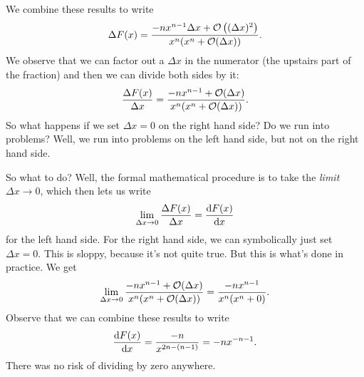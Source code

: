 We combine these results to write
\begin{equation}
\Delta F(x)=\frac{-nx^{n-1}\Delta x+\mathcal{O}\left((\Delta x)^{2}\right)}{x^{n}(x^{n}+\mathcal{O}(\Delta x))}.
\end{equation}
We observe that we can factor out a $\Delta x$ in the numerator
(the upstairs part of the fraction) and then we can divide both
sides by it:
\begin{equation}
\frac{\Delta F(x)}{\Delta x}=\frac{-nx^{n-1}+\mathcal{O}(\Delta x)}{x^{n}(x^{n}+\mathcal{O}(\Delta x))}.
\end{equation}
So what happens if we set $\Delta x=0$ on the right hand side? Do
we run into problems? Well, we run into problems on the left hand
side, but not on the right hand side.

So what to do? Well, the formal mathematical procedure is to take
the \emph{limit} $\Delta x\to0$, which then lets us write
\begin{equation}
\lim_{\Delta x\to0}\frac{\Delta F(x)}{\Delta x}=\frac{\mathrm{d} F(x)}{\mathrm{d}
x}
\end{equation}
for the left hand side. For the right hand side, we can
symbolically just set $\Delta x=0$. This is sloppy, because it's
not quite true. But this is what's done in practice. We get
\begin{equation}
\lim_{\Delta x\to0}\frac{-nx^{n-1}+\mathcal{O}(\Delta x)}{x^{n}(x^{n}+\mathcal{O}(\Delta x))}
= \frac{-nx^{n-1}}{x^{n}(x^{n}+0)}.
\end{equation}
Observe that we can combine these results to write
\begin{equation}
\frac{\mathrm{d} F(x)}{\mathrm{d} x}=\frac{-n}{x^{2n-(n-1)}}=-nx^{-n-1}.
\end{equation}
There was no risk of dividing by zero anywhere.

